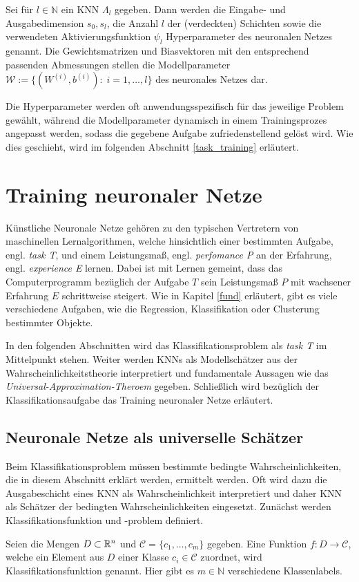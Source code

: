 \begin{defi}
    Sei für $l \in \mathbb{N}$ ein KNN $\Lambda_l$ gegeben. Dann werden die Eingabe- und Ausgabedimension $s_0, s_l$, die Anzahl $l$ der (verdeckten) Schichten sowie die verwendeten Aktivierungsfunktion $\psi_l$ Hyperparameter des neuronalen Netzes genannt.
    Die Gewichtsmatrizen und Biasvektoren mit den entsprechend passenden Abmessungen stellen die Modellparameter $\mathcal{W}:=\{(W^{(i)},b^{(i)}): \; i=1, \ldots, l\}$ des neuronales Netzes dar. 
\end{defi}
Die Hyperparameter werden oft anwendungsspezifisch für das jeweilige Problem gewählt, während die Modellparameter dynamisch in einem Trainingsprozes angepasst werden, sodass die gegebene Aufgabe zufriedenstellend gelöst wird. Wie dies geschieht, wird im folgenden Abschnitt \ref{task_training} erläutert.

\section{Training neuronaler Netze}
\label{abs:task_training}
Künstliche Neuronale Netze gehören zu den typischen Vertretern von maschinellen Lernalgorithmen, welche hinsichtlich einer bestimmten Aufgabe, engl. \textit{task T}, und einem Leistungsmaß, engl. \textit{perfomance P} an der Erfahrung, engl. \textit{experience E} lernen\cite{Goodfellow-et-al-2016}. Dabei ist mit Lernen gemeint, dass das Computerprogramm bezüglich der Aufgabe $T$ sein Leistungsmaß $P$ mit wachsener Erfahrung $E$ schrittweise steigert. Wie in Kapitel \ref{fund} erläutert, gibt es viele verschiedene Aufgaben, wie die Regression, Klassifikation oder Clusterung bestimmter Objekte. 

In den folgenden Abschnitten wird das Klassifikationsproblem als \textit{task T} im Mittelpunkt stehen. Weiter werden KNNs als Modellschätzer aus der Wahrscheinlichkeitstheorie interpretiert und fundamentale Aussagen wie das \textit{Universal-Approximation-Theroem}\cite{HORNIK1989359} gegeben. Schließlich wird bezüglich der Klassifikationsaufgabe das Training neuronaler Netze erläutert.


\subsection{Neuronale Netze als universelle Schätzer}
\label{NN_estimators_abs}
Beim Klassifikationsproblem müssen bestimmte bedingte Wahrscheinlichkeiten, die in diesem Abschnitt erklärt werden, ermittelt werden. Oft wird dazu die Ausgabeschicht eines KNN als Wahrscheinlichkeit interpretiert und daher KNN als Schätzer der bedingten Wahrscheinlichkeiten eingesetzt. Zunächst werden Klassifikationsfunktion und -problem definiert.
\begin{defi}
    \label{def_classfun}
    Seien die Mengen $D \subset \mathbb{R}^n$ und $\mathcal{C}=\{c_1, \ldots, c_m\}$ gegeben. Eine Funktion $f: D \rightarrow \mathcal{C}$, welche ein Element aus $D$ einer Klasse $c_i \in \mathcal{C}$ zuordnet, wird Klassifikationsfunktion genannt. Hier gibt es $m \in \mathbb{N}$ verschiedene Klassenlabels.
\end{defi}

